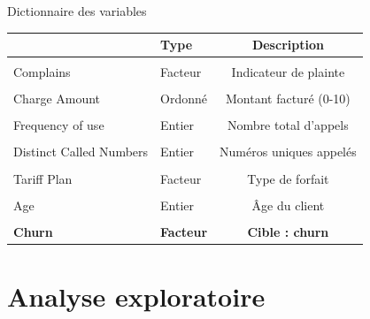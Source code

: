 \documentclass[
  10pt,
  ignorenonframetext,
  aspectratio=169,
]{beamer}
\begin{document}
\begin{frame}{Dictionnaire des variables}
\label{dictionnaire-des-variables}
\begingroup\fontsize{7}{9}\selectfont

\begin{longtable*}[t]{llc}
\toprule
 & Type & Description\\
\midrule
{} &  & \\
Complains & Facteur & Indicateur de plainte\\
 &  & \\
Charge  Amount & Ordonné & Montant facturé (0-10)\\
 &  & \\
\addlinespace
Frequency of use & Entier & Nombre total d'appels\\
 &  & \\
Distinct Called Numbers & Entier & Numéros uniques appelés\\
 &  & \\
Tariff Plan & Facteur & Type de forfait\\
\addlinespace
{} &  & \\
Age & Entier & Âge du client\\
 &  & \\
\textcolor[HTML]{E24B4A}{\textbf{Churn}} & \textcolor[HTML]{E24B4A}{\textbf{Facteur}} & \textcolor[HTML]{E24B4A}{\textbf{Cible : churn}}\\
\bottomrule
\end{longtable*}
\endgroup{}
\end{frame}

\section{Analyse exploratoire}\label{analyse-exploratoire}
\end{document}
